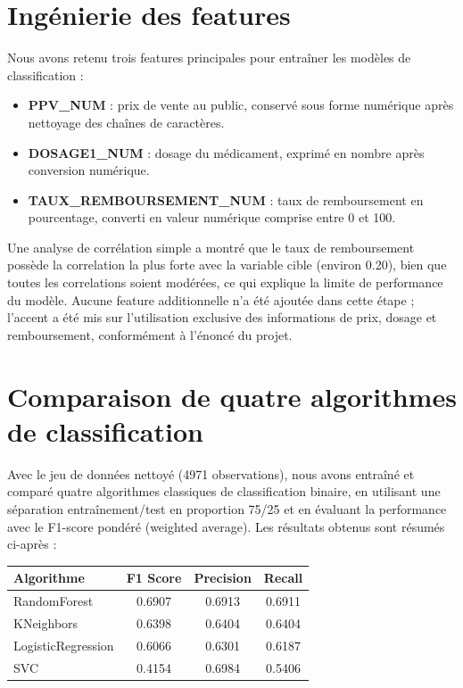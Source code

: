 \documentclass[12pt,a4paper]{report}
\begin{document}
\section{Ingénierie des features}
Nous avons retenu trois features principales pour entraîner les modèles de classification :
\begin{itemize}
    \item \textbf{PPV\_NUM} : prix de vente au public, conservé sous forme numérique après nettoyage des chaînes de caractères.
    \item \textbf{DOSAGE1\_NUM} : dosage du médicament, exprimé en nombre après conversion numérique.
    \item \textbf{TAUX\_REMBOURSEMENT\_NUM} : taux de remboursement en pourcentage, converti en valeur numérique comprise entre 0 et 100.
\end{itemize}
Une analyse de corrélation simple a montré que le taux de remboursement possède la correlation la plus forte avec la variable cible (environ 0.20), bien que toutes les correlations soient modérées, ce qui explique la limite de performance du modèle. Aucune feature additionnelle n'a été ajoutée dans cette étape ; l'accent a été mis sur l'utilisation exclusive des informations de prix, dosage et remboursement, conformément à l'énoncé du projet.

\section{Comparaison de quatre algorithmes de classification}
Avec le jeu de données nettoyé (4971 observations), nous avons entraîné et comparé quatre algorithmes classiques de classification binaire, en utilisant une séparation entraînement/test en proportion 75/25 et en évaluant la performance avec le F1-score pondéré (weighted average). Les résultats obtenus sont résumés ci-après :

\begin{table}[h!]
\centering
\begin{tabular}{lccc}
\toprule
\textbf{Algorithme} & \textbf{F1 Score} & \textbf{Precision} & \textbf{Recall} \\
\midrule
RandomForest & 0.6907 & 0.6913 & 0.6911 \\
KNeighbors & 0.6398 & 0.6404 & 0.6404 \\
LogisticRegression & 0.6066 & 0.6301 & 0.6187 \\
SVC & 0.4154 & 0.6984 & 0.5406 \\
\bottomrule
\end{tabular}
\end{table}
\end{document}
